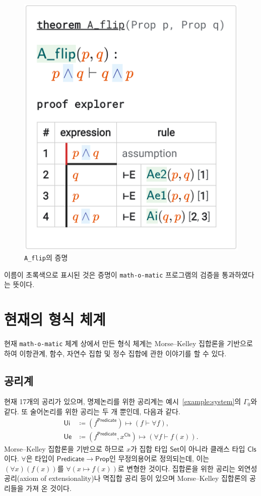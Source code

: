 \documentclass[10pt,twocolumn]{article}
\theoremstyle{definition}
\newcommand{\Prop}{\mathsf{Prop}}
\newcommand{\Set}{\mathsf{Set}}
\newcommand{\Cls}{\mathsf{Cls}}
\begin{document}
\begin{figure}[hbt!] \centering
	\includegraphics[scale=.18]{A_flip}
	\caption{\texttt{A\_flip}의 증명} \label{fig:Aflip}
\end{figure}

이름이 초록색으로 표시된 것은 증명이 \texttt{math-o-matic} 프로그램의 검증을 통과하였다는 뜻이다.

\section{현재의 형식 체계}

현재 \texttt{math-o-matic} 체계 상에서 만든 형식 체계는 Morse--Kelley 집합론을 기반으로 하여 이항관계, 함수, 자연수 집합 및 정수 집합에 관한 이야기를 할 수 있다.

\subsection{공리계}

현재 17개의 공리가 있으며, 명제논리를 위한 공리계는 예시~\ref{example:system}의 $\Gamma_0$와 같다. 또 술어논리를 위한 공리는 두 개 뿐인데, 다음과 같다.
\begin{align*}
	\mathsf{Ui}&\coloneqq (f^{\mathsf{Predicate}})\mapsto (f\vdash\forall f), \\
	\mathsf{Ue}&\coloneqq (f^{\mathsf{Predicate}}, x^\Cls)\mapsto (\forall f\vdash f(x)).
\end{align*}
Morse--Kelley 집합론을 기반으로 하므로 $x$가 집합 타입 $\Set$이 아니라 클래스 타입 $\Cls$이다. $\forall$은 타입이 $\mathsf{Predicate}\to\Prop$인 무정의용어로 정의되는데, 이는 $(\forall x)(f(x))$를 $\forall(x\mapsto f(x))$로 변형한 것이다. 집합론을 위한 공리는 외연성 공리(axiom of extensionality)나 멱집합 공리 등이 있으며 Morse--Kelley 집합론의 공리들을 가져 온 것이다.
\end{document}
